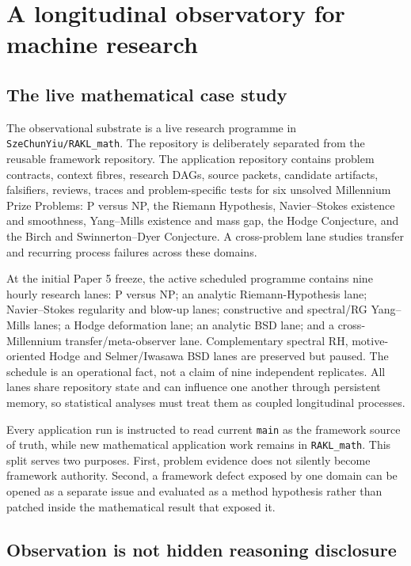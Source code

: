 \section{A longitudinal observatory for machine research}

\subsection{The live mathematical case study}

The observational substrate is a live research programme in \texttt{SzeChunYiu/RAKL\_math}. The repository is deliberately separated from the reusable \RAKL{} framework repository. The application repository contains problem contracts, context fibres, research DAGs, source packets, candidate artifacts, falsifiers, reviews, traces and problem-specific tests for six unsolved Millennium Prize Problems: P versus NP, the Riemann Hypothesis, Navier--Stokes existence and smoothness, Yang--Mills existence and mass gap, the Hodge Conjecture, and the Birch and Swinnerton--Dyer Conjecture. A cross-problem lane studies transfer and recurring process failures across these domains.

At the initial Paper 5 freeze, the active scheduled programme contains nine hourly research lanes: P versus NP; an analytic Riemann-Hypothesis lane; Navier--Stokes regularity and blow-up lanes; constructive and spectral/RG Yang--Mills lanes; a Hodge deformation lane; an analytic BSD lane; and a cross-Millennium transfer/meta-observer lane. Complementary spectral RH, motive-oriented Hodge and Selmer/Iwasawa BSD lanes are preserved but paused. The schedule is an operational fact, not a claim of nine independent replicates. All lanes share repository state and can influence one another through persistent memory, so statistical analyses must treat them as coupled longitudinal processes.

Every application run is instructed to read current \RAKL{} \texttt{main} as the framework source of truth, while new mathematical application work remains in \texttt{RAKL\_math}. This split serves two purposes. First, problem evidence does not silently become framework authority. Second, a framework defect exposed by one domain can be opened as a separate \RAKL{} issue and evaluated as a method hypothesis rather than patched inside the mathematical result that exposed it.

\subsection{Observation is not hidden reasoning disclosure}

